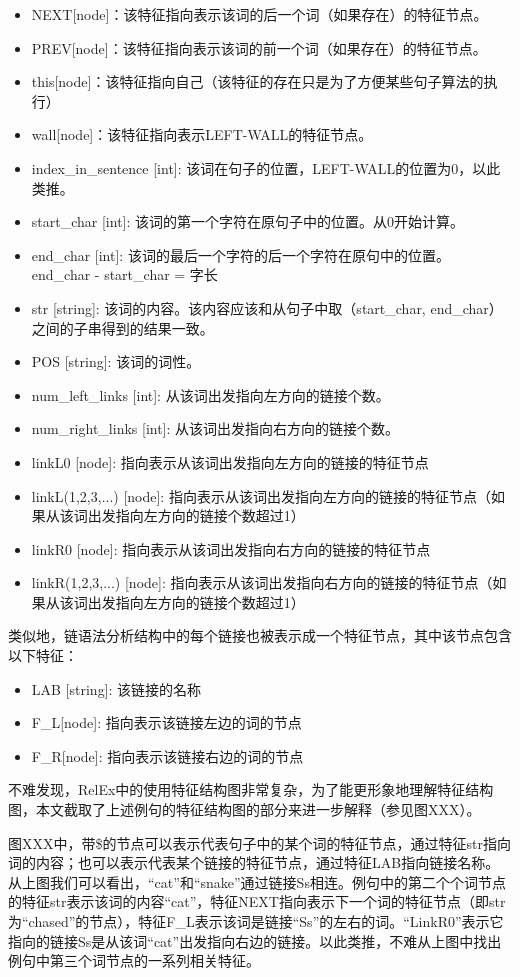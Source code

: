 \begin{itemize}
\item NEXT[node]：该特征指向表示该词的后一个词（如果存在）的特征节点。
\item PREV[node]：该特征指向表示该词的前一个词（如果存在）的特征节点。
\item this[node]：该特征指向自己（该特征的存在只是为了方便某些句子算法的执行）
\item wall[node]：该特征指向表示LEFT-WALL的特征节点。
\item index\_in\_sentence [int]: 该词在句子的位置，LEFT-WALL的位置为0，以此类推。
\item start\_char [int]: 该词的第一个字符在原句子中的位置。从0开始计算。
\item end\_char [int]: 该词的最后一个字符的后一个字符在原句中的位置。 end\_char - start\_char = 字长
\item str [string]: 该词的内容。该内容应该和从句子中取（start\_char, end\_char）之间的子串得到的结果一致。
\item POS [string]: 该词的词性。
\item num\_left\_links [int]: 从该词出发指向左方向的链接个数。
\item num\_right\_links [int]: 从该词出发指向右方向的链接个数。
\item linkL0 [node]: 指向表示从该词出发指向左方向的链接的特征节点
\item linkL(1,2,3,...) [node]: 指向表示从该词出发指向左方向的链接的特征节点（如果从该词出发指向左方向的链接个数超过1）
\item linkR0 [node]: 指向表示从该词出发指向右方向的链接的特征节点
\item linkR(1,2,3,...) [node]: 指向表示从该词出发指向右方向的链接的特征节点（如果从该词出发指向左方向的链接个数超过1）
\end{itemize}

类似地，链语法分析结构中的每个链接也被表示成一个特征节点，其中该节点包含以下特征：
\begin{itemize}
\item LAB [string]: 该链接的名称
\item F\_L[node]: 指向表示该链接左边的词的节点
\item F\_R[node]: 指向表示该链接右边的词的节点
\end{itemize}

不难发现，RelEx中的使用特征结构图非常复杂，为了能更形象地理解特征结构图，本文截取了上述例句的特征结构图的部分来进一步解释（参见图XXX）。
 
  图XXX中，带\$的节点可以表示代表句子中的某个词的特征节点，通过特征str指向词的内容；也可以表示代表某个链接的特征节点，通过特征LAB指向链接名称。从上图我们可以看出，“cat”和“snake”通过链接Ss相连。例句中的第二个个词节点的特征str表示该词的内容“cat”，特征NEXT指向表示下一个词的特征节点（即str为“chased”的节点），特征F\_L表示该词是链接“Ss”的左右的词。“LinkR0”表示它指向的链接Ss是从该词“cat”出发指向右边的链接。以此类推，不难从上图中找出例句中第三个词节点的一系列相关特征。

